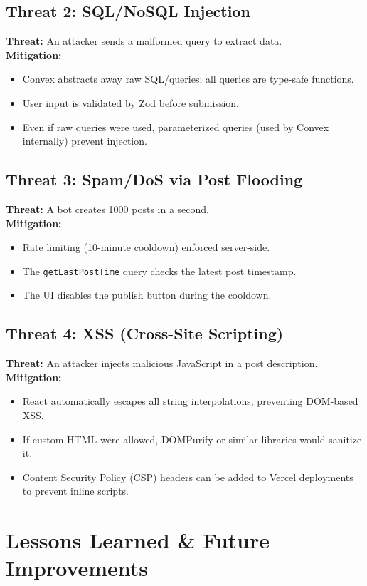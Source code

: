 \documentclass[11pt,a4paper]{article}
\begin{document}
\subsection{Threat 2: SQL/NoSQL Injection}
\textbf{Threat:} An attacker sends a malformed query to extract data.\\
\textbf{Mitigation:}
\begin{itemize}
    \item Convex abstracts away raw SQL/queries; all queries are type-safe functions.
    \item User input is validated by Zod before submission.
    \item Even if raw queries were used, parameterized queries (used by Convex internally) prevent injection.
\end{itemize}

\subsection{Threat 3: Spam/DoS via Post Flooding}
\textbf{Threat:} A bot creates 1000 posts in a second.\\
\textbf{Mitigation:}
\begin{itemize}
    \item Rate limiting (10-minute cooldown) enforced server-side.
    \item The \texttt{getLastPostTime} query checks the latest post timestamp.
    \item The UI disables the publish button during the cooldown.
\end{itemize}

\subsection{Threat 4: XSS (Cross-Site Scripting)}
\textbf{Threat:} An attacker injects malicious JavaScript in a post description.\\
\textbf{Mitigation:}
\begin{itemize}
    \item React automatically escapes all string interpolations, preventing DOM-based XSS.
    \item If custom HTML were allowed, DOMPurify or similar libraries would sanitize it.
    \item Content Security Policy (CSP) headers can be added to Vercel deployments to prevent inline scripts.
\end{itemize}

\section{Lessons Learned \& Future Improvements}
\end{document}
